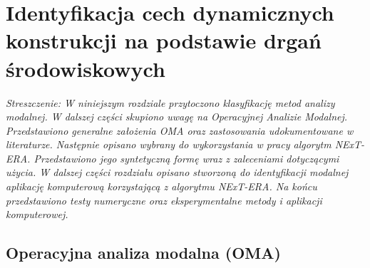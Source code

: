 \chapter{Identyfikacja cech dynamicznych konstrukcji na podstawie drgań środowiskowych}

\textit{Streszczenie: W niniejszym rozdziale przytoczono klasyfikację metod analizy modalnej. W dalszej części skupiono uwagę na Operacyjnej Analizie Modalnej. Przedstawiono generalne założenia OMA oraz zastosowania udokumentowane w literaturze. Następnie opisano wybrany do wykorzystania w pracy algorytm NExT-ERA. Przedstawiono jego syntetyczną formę wraz z zaleceniami dotyczącymi użycia. W dalszej części rozdziału opisano stworzoną do identyfikacji modalnej aplikację komputerową korzystającą z algorytmu NExT-ERA. Na końcu przedstawiono testy numeryczne oraz eksperymentalne metody i aplikacji komputerowej.}


\section{Operacyjna analiza modalna (OMA)} \label{sect:OMA}
